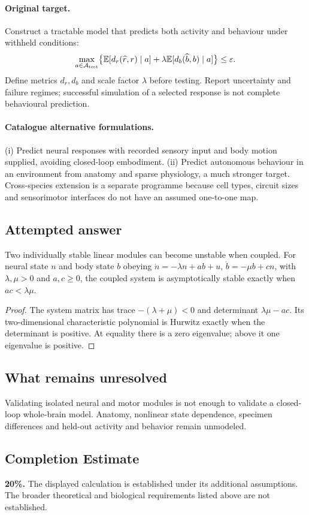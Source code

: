 \documentclass[11pt]{article}
\begin{document}
\paragraph{Original target.}
Construct a tractable model that predicts both activity and behaviour under withheld conditions:
\[
\max_{a\in\mathcal A_{\rm test}}\bigl\{\mathbb{E}[d_r(\widehat r,r)\mid a]+\lambda\mathbb{E}[d_b(\widehat b,b)\mid a]\bigr\}\leq\varepsilon.
\]
Define metrics $d_r,d_b$ and scale factor $\lambda$ before testing. Report uncertainty and failure regimes; successful simulation of a selected response is not complete behavioural prediction.
\paragraph{Catalogue alternative formulations.}
(i) Predict neural responses with recorded sensory input and body motion supplied, avoiding closed-loop embodiment. (ii) Predict autonomous behaviour in an environment from anatomy and sparse physiology, a much stronger target. Cross-species extension is a separate programme because cell types, circuit sizes and sensorimotor interfaces do not have an assumed one-to-one map.
\subsection{Attempted answer}
\begin{proposition}
Two individually stable linear modules can become unstable when coupled. For neural state $n$ and body state $b$ obeying $\dot n=-\lambda n+ab+u$, $\dot b=-\mu b+cn$, with $\lambda,\mu>0$ and $a,c\geq0$, the coupled system is asymptotically stable exactly when $ac<\lambda\mu$.
\end{proposition}
\begin{proof}
The system matrix has trace $-(\lambda+\mu)<0$ and determinant $\lambda\mu-ac$. Its two-dimensional characteristic polynomial is Hurwitz exactly when the determinant is positive. At equality there is a zero eigenvalue; above it one eigenvalue is positive.
\end{proof}
\subsection{What remains unresolved}
Validating isolated neural and motor modules is not enough to validate a closed-loop whole-brain model. Anatomy, nonlinear state dependence, specimen differences and held-out activity and behavior remain unmodeled.
\subsection{Completion Estimate}
\textbf{20\%.} The displayed calculation is established under its additional assumptions. The broader theoretical and biological requirements listed above are not established.
\end{document}
